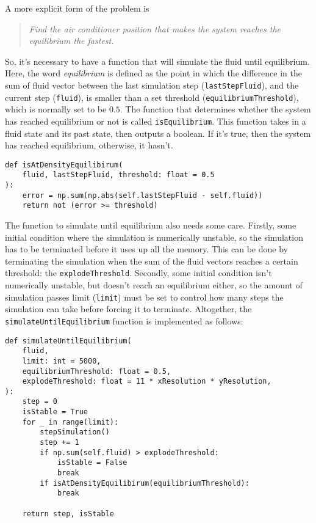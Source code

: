 A more explicit form of the problem is
\begin{quote}
	\emph{Find the air conditioner position that makes the system reaches the equilibrium the fastest.}
\end{quote}
So, it's necessary to have a function that will simulate the fluid until equilibrium. Here, the word \emph{equilibrium} is defined as the point in which the difference in the sum of fluid vector between the last simulation step (\texttt{lastStepFluid}), and the current step (\texttt{fluid}), is smaller than a set threshold (\texttt{equilibriumThreshold}), which is normally set to be $0.5$. The function that determines whether the system has reached equilibrium or not is called \texttt{isEquilibrium}. This function takes in a fluid state and its past state, then outputs a boolean. If it's true, then the system has reached equilibrium, otherwise, it hasn't.
\begin{verbatim}
def isAtDensityEquilibirum(
    fluid, lastStepFluid, threshold: float = 0.5
):
    error = np.sum(np.abs(self.lastStepFluid - self.fluid))
    return not (error >= threshold)
\end{verbatim}

The function to simulate until equilibrium also needs some care. Firstly, some initial condition where the simulation is numerically unstable, so the simulation has to be terminated before it uses up all the memory. This can be done by terminating the simulation when the sum of the fluid vectors reaches a certain threshold: the \texttt{explodeThreshold}. Secondly, some initial condition isn't numerically unstable, but doesn't reach an equilibrium either, so the amount of simulation passes limit (\texttt{limit}) must be set to control how many steps the simulation can take before forcing it to terminate. Altogether, the \texttt{simulateUntilEquilibrium} function is implemented as follows:
\begin{verbatim}
def simulateUntilEquilibrium(
    fluid,
    limit: int = 5000,
    equilibriumThreshold: float = 0.5,
    explodeThreshold: float = 11 * xResolution * yResolution,
):
    step = 0
    isStable = True
    for _ in range(limit):
        stepSimulation()
        step += 1
        if np.sum(self.fluid) > explodeThreshold:
            isStable = False
            break
        if isAtDensityEquilibirum(equilibriumThreshold):
            break
    
    return step, isStable
\end{verbatim}

